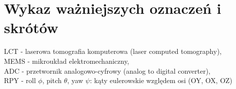 \chapter*{Wykaz ważniejszych oznaczeń i skrótów} 

\noindent LCT - laserowa tomografia komputerowa (laser computed tomography), \\
MEMS - mikroukład elektromechaniczny, \\
ADC - przetwornik analogowo-cyfrowy (analog to digital converter), \\
RPY - roll $\phi$, pitch $\theta$, yaw $\psi$: kąty eulerowskie względem osi (OY, OX, OZ)